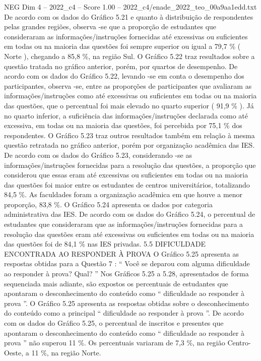 \begin{textsample}{NEG Dim 4 – 2022\_c4 – Score 1.00 – 2022\_c4/enade\_2022\_teo\_00a9aa1edd.txt}
De acordo com os dados do Gráfico 5.21 e quanto à distribuição de respondentes pelas grandes regiões, observa -se que a proporção de estudantes que consideraram as informações/instruções fornecidas até excessivas ou suficientes em todas ou na maioria das questões foi sempre superior ou igual a 79,7 \% ( Norte ), chegando a 85,8 \%, na região Sul.
O Gráfico 5.22 traz resultados sobre a questão tratada no gráfico anterior, porém, por quartos de desempenho.
De acordo com os dados do Gráfico 5.22, levando -se em conta o desempenho dos participantes, observa -se, entre as proporções de participantes que avaliaram as informações/instruções como até excessivas ou suficientes em todas ou na maioria das questões, que o percentual foi mais elevado no quarto superior ( 91,9 \% ).
Já no quarto inferior, a suficiência das informações/instruções declarada como até excessiva, em todas ou na maioria das questões, foi percebida por 75,1 \% dos respondentes.
O Gráfico 5.23 traz outros resultados também em relação à mesma questão retratada no gráfico anterior, porém por organização acadêmica das IES.
De acordo com os dados do Gráfico 5.23, considerando -se as informações/instruções fornecidas para a resolução das questões, a proporção que considerou que essas eram até excessivas ou suficientes em todas ou na maioria das questões foi maior entre os estudantes de centros universitários, totalizando 84,5 \%.
As faculdades foram a organização acadêmica em que houve a menor proporção, 83,8 \%.
O Gráfico 5.24 apresenta os dados por categoria administrativa das IES.
De acordo com os dados do Gráfico 5.24, o percentual de estudantes que consideraram que as informações/instruções fornecidas para a resolução das questões eram até excessivas ou suficientes em todas ou na maioria das questões foi de 84,1 \% nas IES privadas. 5.5 DIFICULDADE ENCONTRADA AO RESPONDER À PROVA O Gráfico 5.25 apresenta as respostas obtidas para a Questão 7 : “ Você se deparou com alguma dificuldade ao responder à prova?
Qual? ” Nos Gráficos 5.25 a 5.28, apresentados de forma sequenciada mais adiante, são expostos os percentuais de estudantes que apontaram o desconhecimento do conteúdo como “ dificuldade ao responder à prova ”.
O Gráfico 5.25 apresenta as respostas obtidas sobre o desconhecimento do conteúdo como a principal “ dificuldade ao responder à prova ”.
De acordo com os dados do Gráfico 5.25, o percentual de inscritos e presentes que apontaram o desconhecimento do conteúdo como “ dificuldade ao responder à prova ” não superou 11 \%.
Os percentuais variaram de 7,3 \%, na região Centro-Oeste, a 11 \%, na região Norte.

\end{textsample}
